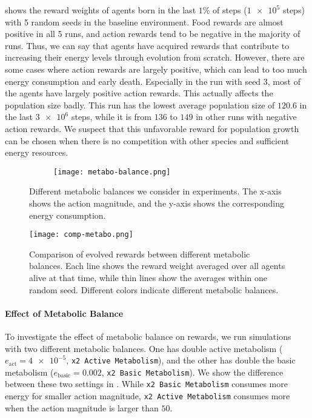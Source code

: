  shows the reward weights of agents born in the last $1\%$ of steps ($\num{1e5}$ steps) with 5 random seeds in the baseline environment. Food rewards are almost positive in all 5 runs, and action rewards tend to be negative in the majority of runs. Thus, we can say that agents have acquired rewards that contribute to increasing their energy levels through evolution from scratch. However, there are some cases where action rewards are largely positive, which can lead to too much energy consumption and early death. Especially in the run with seed $3$, most of the agents have largely positive action rewards. This actually affects the population size badly. This run has the lowest average population size of $120.6$ in the last $\num{3e6}$ steps, while it is from $136$ to $149$ in other runs with negative action rewards. We suspect that this unfavorable reward for population growth can be chosen when there is no competition with other species and sufficient energy resources.

\begin{figure}[t]
  \begin{subfigure}[t]{8cm}
    \centering
    \texttt{[image: metabo-balance.png]}
  \end{subfigure}
  \caption{
    Different metabolic balances we consider in experiments. The x-axis shows the action magnitude, and the y-axis shows the corresponding energy consumption.
  }\label{figure:metabo-balance}
\end{figure}

\begin{figure}[t]
  \centering
  \texttt{[image: comp-metabo.png]}
  \caption{
    Comparison of evolved rewards between different metabolic balances.
    Each line shows the reward weight averaged over all agents alive at that time, while thin lines show the averages within one random seed.
    Different colors indicate different metabolic balances.
  }\label{figure:result-metabolism}
\end{figure}

\paragraph{Effect of Metabolic Balance}
To investigate the effect of metabolic balance on rewards, we run simulations with two different metabolic balances. One has double active metabolism ($e_{\mathrm{act}} = \num{4e-5}$, \texttt{x2 Active Metabolism}), and the other has double the basic metabolism ($e_{\mathrm{basic}} = 0.002$, \texttt{x2 Basic Metabolism}). We show the difference between these two settings in . While \texttt{x2 Basic Metabolism} consumes more energy for smaller action magnitude, \texttt{x2 Active Metabolism} consumes more when the action magnitude is larger than $50$.


